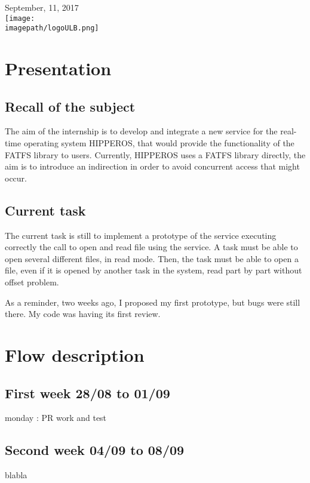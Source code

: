 \documentclass[12pt]{article}
\begin{document}
\begin{titlepage}

{\large September, 11, 2017 }\\[2cm] %



\texttt{[image: \\imagepath/logoULB.png]}\\[1cm] 
 

\vfill %

\end{titlepage}

\newpage


\pagestyle{fancy}
\fancyhf{}
\setlength\headheight{15pt}
\fancyhead[R]{}
\fancyfoot[L]{\today}
\fancyfoot[R]{\thepage}

\newpage

\section{Presentation}
\subsection{Recall of the subject}
The aim of the internship is to develop and integrate a new service for the real-time operating system HIPPEROS, 
that would provide the functionality of the FATFS library to users.
Currently, HIPPEROS uses a FATFS library directly, the aim is to introduce an indirection in order to 
avoid concurrent access that might occur.

\subsection{Current task}
The current task is still to implement a prototype of the service 
executing correctly the call to open and read file using the service. 
A task must be able to open several different files, in read mode.
Then, the task must be able to open a file, even if it is opened 
by another task in the system, read part by part without offset problem.

As a reminder, two weeks ago, I proposed my first prototype, but 
bugs were still there. My code was having its first review.

\section{Flow description}
\subsection{First week 28/08 to 01/09}
monday : PR work and test

\subsection{Second week 04/09 to 08/09}
blabla
\end{document}
